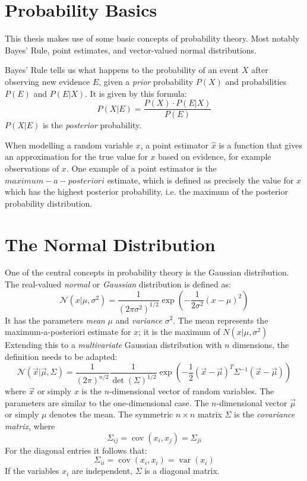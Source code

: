 \documentclass[twoside,12pt,a4paper]{report}
\newcommand{\cov}{\operatorname{cov}}
\newcommand{\var}{\operatorname{var}}
\begin{document}
\section{Probability Basics}
This thesis makes use of some basic concepts of probability theory. Most notably Bayes' Rule, point estimates, and vector-valued normal distributions.

Bayes' Rule tells us what happens to the probability of an event $X$ after observing new evidence $E$, given a \textit{prior} probability $P(X)$ and probabilities $P(E)$ and $P(E|X)$. It is given by this formula:
$$P(X|E) = \frac{P(X) \cdot P(E|X)}{P(E)}$$
$P(X|E)$ is the \textit{posterior} probability.

When modelling a random variable $x$, a point estimator $\hat{x}$ is a function that gives an approximation for the true value for $x$ based on evidence, for example observations of $x$. One example of a point estimator is the $maximum-a-posteriori$ estimate, which is defined as precisely the value for $x$ which has the highest posterior probability, i.e. the maximum of the posterior probability distribution.

\section{The Normal Distribution}

One of the central concepts in probability theory is the Gaussian distribution.
The real-valued \textit{normal} or \textit{Gaussian} distribution is defined as:
$$\mathcal{N}(x | \mu, \sigma^2) = \frac{1}{(2\pi \sigma^2)^{1/2}} \exp\left(- \frac{1}{2\sigma^2} (x-\mu)^2 \right)$$
It has the parameters \textit{mean} $\mu$ and \textit{variance} $\sigma ^2$.
The mean represents the maximum-a-posteriori estimate for $x$; it is the maximum of $N(x | \mu, \sigma^2)$
Extending this to a \textit{multivariate} Gaussian distribution with $n$ dimensions, the definition needs to be adapted:
$$\mathcal{N}(\vec{x} | \vec{\mu}, \Sigma) = \frac{1}{(2\pi)^{n/2}} \frac{1}{\det(\Sigma)^{1/2}} \exp\left(-\frac{1}{2} (\vec{x} - \vec{\mu})^T \Sigma ^{-1} (\vec{x} - \vec{\mu})\right)$$
where $\vec{x}$ or simply $x$ is the $n$-dimensional vector of random variables. The parameters are similar to the one-dimensional case. The $n$-dimensional vector $\vec{\mu}$ or simply $\mu$ denotes the mean. The symmetric $n \times n$ matrix $\Sigma$ is the \textit{covariance matrix}, where
$$ \Sigma_{ij} =  \cov(x_i, x_j) = \Sigma_{ji}$$
For the diagonal entries it follows that:
$$\Sigma_{ii} = \cov(x_i,x_i) = \var(x_i)$$
If the variables $x_i$ are independent, $\Sigma$ is a diagonal matrix.
\end{document}

